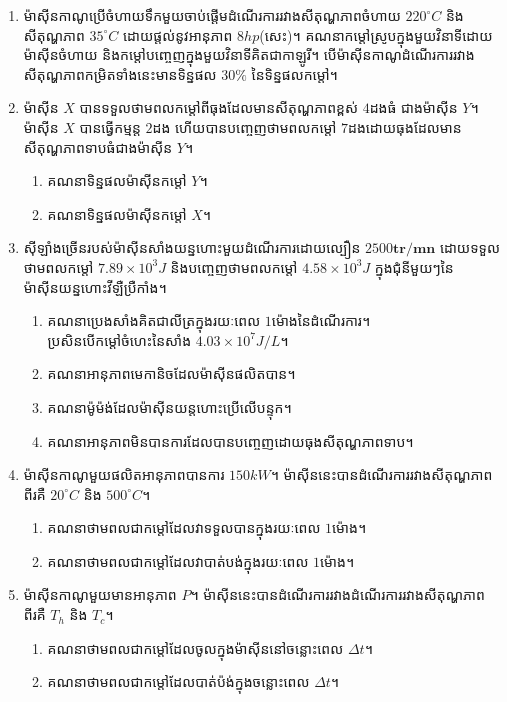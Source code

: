 \begin{enumerate}
	\item ម៉ាសុីនកាណូប្រើចំហាយទឹកមួយចាប់ផ្តើមដំណើរការរវាងសីតុណ្ហភាពចំហាយ $220^\circ C$ និងសីតុណ្ហភាព $35^\circ C$ ដោយផ្តល់នូវអានុភាព $8hp$(សេះ)។ គណនាកម្តៅស្រូបក្នុងមួយវិនាទីដោយម៉ាសុីនចំហាយ និងកម្តៅបញ្ចេញក្នុងមួយវិនាទីគិតជាកាឡូរី។ បើម៉ាសុីនកាណូដំណើរការរវាងសីតុណ្ហភាពកម្រិតទាំងនេះមានទិន្នផល $30\%$ នៃទិន្នផលកម្តៅ។
	\newpage
	\item ម៉ាសុីន $X$ បានទទួលថាមពលកម្តៅពីធុងដែលមានសីតុណ្ហភាពខ្ពស់ $4$ដងធំ ជាងម៉ាសុីន $Y$។ ម៉ាសុីន $X$ បានធ្វើកម្មន្ត $2$ដង ហើយបានបញ្ចេញថាមពលកម្តៅ $7$ដងដោយធុងដែលមានសីតុណ្ហភាពទាបធំជាងម៉ាសុីន $Y$។
	\begin{enumerate}
		\item គណនាទិន្នផលម៉ាសុីនកម្តៅ $Y$។
		\item គណនាទិន្នផលម៉ាសុីនកម្តៅ $X$។
	\end{enumerate}
	\item សុីឡាំងច្រើនរបស់ម៉ាសុីនសាំងយន្នហោះមួយដំណើរការដោយល្បឿន $2500\mathbf{tr/mn}$ ដោយទទួលថាមពលកម្តៅ $7.89\times10^{3}J$ និងបញ្ចេញថាមពលកម្តៅ $4.58\times10^{3}J$ ក្នុងជុំនីមួយៗនៃម៉ាសុីនយន្នហោះវីឡឺ​​​ប្រឺ​​កាំង។
	\begin{enumerate}
		\item គណនាប្រេងសាំងគិតជាលីត្រក្នុងរយៈពេល $1$ម៉ោងនៃដំណើរការ។\\ ប្រសិនបើកម្តៅចំហេះនៃសាំង $4.03\times10^{7}J/L$។
		\item គណនាអានុភាពមេកានិចដែលម៉ាសុីនផលិតបាន។
		\item គណនាម៉ូម៉ង់ដែលម៉ាសុីនយន្តហោះប្រើលើបន្ទុក។
		\item គណនាអានុភាពមិនបានការដែលបានបញ្ចេញដោយធុងសីតុណ្ហភាពទាប។
	\end{enumerate}
	\item ម៉ាសុីនកាណូមួយផលិតអានុភាពបានការ $150kW$។ ម៉ាសុីននេះបានដំណើរការរវាងសីតុណ្ហភាពពីរគឺ $20^\circ C$ និង $500^\circ C$។
	\begin{enumerate}
		\item គណនាថាមពលជាកម្តៅដែលវាទទួលបានក្នុងរយៈពេល $1$ម៉ោង។
		\item គណនាថាមពលជាកម្តៅដែលវាបាត់បង់ក្នុងរយៈពេល $1$ម៉ោង។
	\end{enumerate}
	\item ម៉ាសុីនកាណូមួយមានអានុភាព $P$។ ម៉ាសុីននេះបានដំណើរការរវាងដំណើរការរវាងសីតុណ្ហភាពពីរគឺ $T_{h}$ និង $T_{c}$។
	\begin{enumerate}
		\item គណនាថាមពលជាកម្តៅដែលចូលក្នុងម៉ាសុីននៅចន្លោះពេល $\Delta t$។
		\item គណនាថាមពលជាកម្តៅដែលបាត់ប៉ង់ក្នុងចន្លោះពេល $\Delta t$។
	\end{enumerate}

\end{enumerate}
